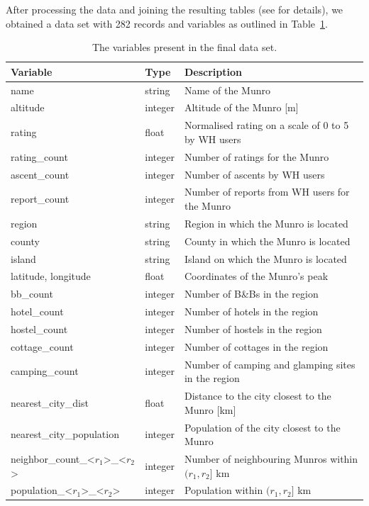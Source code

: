 \documentclass[11pt,a4paper]{article}
\begin{document}
After processing the data and joining the resulting tables (see  for details), we obtained a data set with 282 records and variables as outlined in Table~\ref{table:1}.

\begin{table}
    \caption{The variables present in the final data set.}
    \label{table:1}
    \centering
    \begin{tabular}{l  l  l} 
        \toprule
        Variable & Type & Description  \\ 
        \midrule
        name & string & Name of the Munro \\ 
        altitude & integer & Altitude of the Munro [m] \\
        \hline
        rating & float & Normalised rating on a scale of 0 to 5 by WH users\\
        rating\_count & integer & Number of ratings for the Munro \\
        ascent\_count & integer & Number of ascents by WH users\\
        report\_count & integer & Number of reports from WH users for the Munro\\
        \hline
        region & string & Region in which the Munro is located \\
        county & string & County in which the Munro is located\\
        island & string & Island on which the Munro is located\\
        latitude, longitude & float & Coordinates of the Munro's peak\\
        \hline
        bb\_count & integer & Number of B\&Bs in the region\\
        hotel\_count & integer & Number of hotels in the region\\
        hostel\_count & integer & Number of hostels in the region\\
        cottage\_count & integer & Number of cottages in the region\\
        camping\_count & integer & Number of camping and glamping sites in the region\\
        \hline
        nearest\_city\_dist & float & Distance to the city closest to the Munro [km]\\
        nearest\_city\_population & integer & Population of the city closest to the Munro\\
        neighbor\_count\_<$r_1$>\_<$r_2$> & integer & Number of neighbouring Munros within $(r_1,r_2]$ km\\
        population\_<$r_1$>\_<$r_2$> & integer & Population within $(r_1,r_2]$ km\\
        \bottomrule
    \end{tabular}
\end{table}
\end{document}
